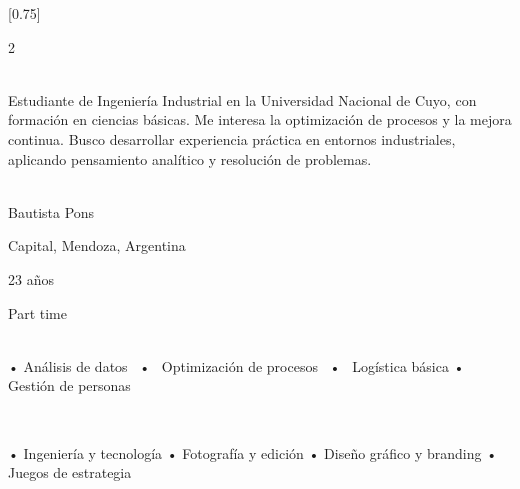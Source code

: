 \documentclass[lighthipster]{simplehipstercv}
\begin{document}
\setlength{\columnsep}{1.5cm}
[0.75]
\begin{paracol}{2}

\paracolbackgroundoptions



\footnotesize
{\setasidefontcolour
\flushright
\begin{center}
\end{center}

\\[0.5em]

{Estudiante de Ingeniería Industrial en la Universidad Nacional de Cuyo, con formación en ciencias básicas. Me interesa la optimización de procesos y la mejora continua. Busco desarrollar experiencia práctica en entornos industriales, aplicando pensamiento analítico y resolución de problemas. }
\bigskip

 \\[0.5em]
Bautista Pons

Capital, Mendoza, Argentina

23 años

Part time

\bigskip

 \\[0.5em]

• Análisis de datos ~•~ Optimización de procesos ~•~ Logística básica • Gestión de personas

\bigskip




\bigskip

\\[0.5em]
\item 
• Ingeniería y tecnología 
• Fotografía y edición 
• Diseño gráfico y branding 
• Juegos de estrategia 
\bigskip



\vspace{4em}




\phantom{turn the page}

}
\end{paracol}
\end{document}
